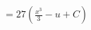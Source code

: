 \documentclass[preview]{standalone}
\begin{document}
\begin{align*}
&=27(\frac{x^3}{3}-u+C)
\end{align*}
\end{document}
